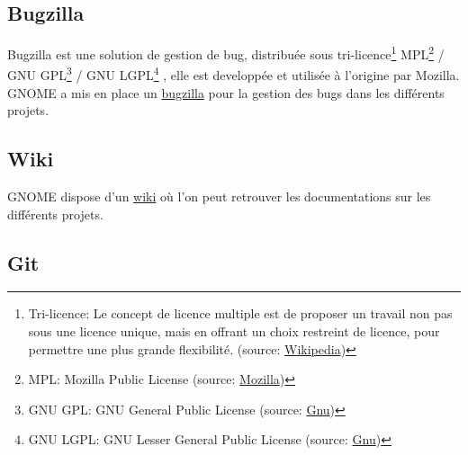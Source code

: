\documentclass[12pt]{report}
\begin{document}
\subsection{Bugzilla}
\label{bugzilla}
Bugzilla est une solution de gestion de bug, distribuée sous
tri-licence\footnote{Tri-licence: Le concept de licence multiple
  est de proposer un travail non pas sous une licence unique, mais
  en offrant un choix restreint de licence, pour permettre une plus
  grande flexibilité. (source:
  \href{https://fr.wikipedia.org/wiki/Licence_multiple}{Wikipedia})}
MPL\footnote{MPL: Mozilla Public License (source:
  \href{https://www.mozilla.org/en-US/MPL/}{Mozilla})}
/ GNU GPL\footnote{GNU GPL: GNU General Public License (source:
  \href{https://www.gnu.org/licenses/gpl.html}{Gnu})}
/ GNU LGPL\footnote{GNU LGPL: GNU Lesser General Public License (source:
  \href{https://www.gnu.org/licenses/lgpl.html}{Gnu})}
, elle est developpée et utilisée à l'origine par Mozilla.
GNOME a mis en place un \href{https://bugzilla.gnome.org}{bugzilla} pour 
la gestion des bugs dans les différents projets.

\subsection{Wiki}
\label{wiki}
GNOME dispose d'un \href{https://wiki.gnome.org/}{wiki} où l'on peut retrouver 
les documentations sur les différents projets.

\subsection{Git}
\label{git}
\end{document}
